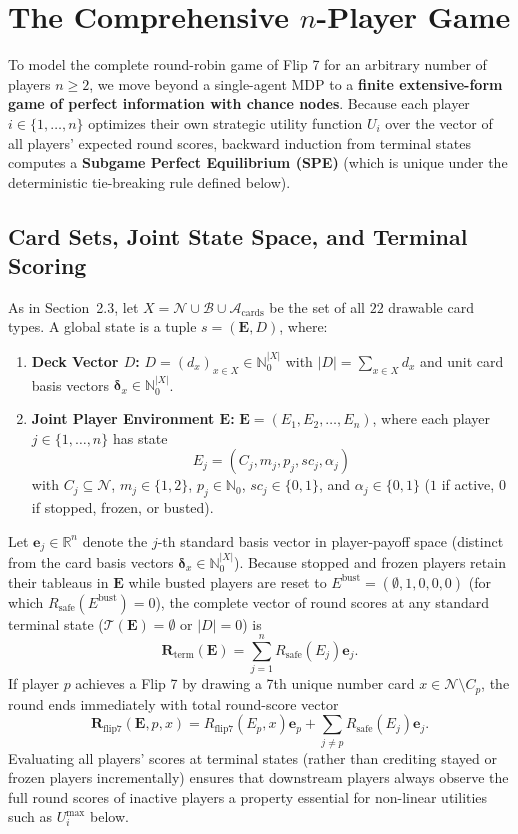 \documentclass{article}
\theoremstyle{plain}
\theoremstyle{definition}
\theoremstyle{remark}
\begin{document}
\section{The Comprehensive $n$-Player Game}\label{sec:nplayer}
To model the complete round-robin game of Flip 7 for an arbitrary number of players $n \ge 2$, we move beyond a single-agent MDP to a \textbf{finite extensive-form game of perfect information with chance nodes}. Because each player $i \in \{1, \dots, n\}$ optimizes their own strategic utility function $U_i$ over the vector of all players' expected round scores, backward induction from terminal states computes a \textbf{Subgame Perfect Equilibrium (SPE)} (which is unique under the deterministic tie-breaking rule defined below).

\subsection{Card Sets, Joint State Space, and Terminal Scoring}
As in Section~2.3, let $X = \mathcal{N} \cup \mathcal{B} \cup \mathcal{A}_{\text{cards}}$ be the set of all $22$ drawable card types. A global state is a tuple $s = (\mathbf{E}, D)$, where:
\begin{enumerate}
    \item \textbf{Deck Vector $D$:} $D = (d_x)_{x \in X} \in \mathbb{N}_0^{|X|}$ with $|D| = \sum_{x \in X} d_x$ and unit card basis vectors $\boldsymbol{\delta}_x \in \mathbb{N}_0^{|X|}$.
    \item \textbf{Joint Player Environment $\mathbf{E}$:} $\mathbf{E} = (E_1, E_2, \dots, E_n)$, where each player $j \in \{1, \dots, n\}$ has state
    \[
        E_j = (C_j, m_j, p_j, sc_j, \alpha_j)
    \]
    with $C_j \subseteq \mathcal{N}$, $m_j \in \{1, 2\}$, $p_j \in \mathbb{N}_0$, $sc_j \in \{0, 1\}$, and $\alpha_j \in \{0, 1\}$ ($1$ if active, $0$ if stopped, frozen, or busted).
\end{enumerate}

Let $\mathbf{e}_j \in \mathbb{R}^n$ denote the $j$-th standard basis vector in player-payoff space (distinct from the card basis vectors $\boldsymbol{\delta}_x \in \mathbb{N}_0^{|X|}$). Because stopped and frozen players retain their tableaus in $\mathbf{E}$ while busted players are reset to $E^{\text{bust}} = (\emptyset, 1, 0, 0, 0)$ (for which $R_{\text{safe}}(E^{\text{bust}}) = 0$), the complete vector of round scores at any standard terminal state ($\mathcal{T}(\mathbf{E}) = \emptyset$ or $|D| = 0$) is
\[
    \mathbf{R}_{\text{term}}(\mathbf{E}) = \sum_{j=1}^{n} R_{\text{safe}}(E_j)\mathbf{e}_j.
\]
If player $p$ achieves a Flip 7 by drawing a 7th unique number card $x \in \mathcal{N} \setminus C_p$, the round ends immediately with total round-score vector
\[
    \mathbf{R}_{\text{flip7}}(\mathbf{E}, p, x) = R_{\text{flip7}}(E_p, x)\mathbf{e}_p + \sum_{j \neq p} R_{\text{safe}}(E_j)\mathbf{e}_j.
\]
Evaluating all players' scores at terminal states (rather than crediting stayed or frozen players incrementally) ensures that downstream players always observe the full round scores of inactive players a property essential for non-linear utilities such as $U_i^{\text{max}}$ below.
\end{document}

